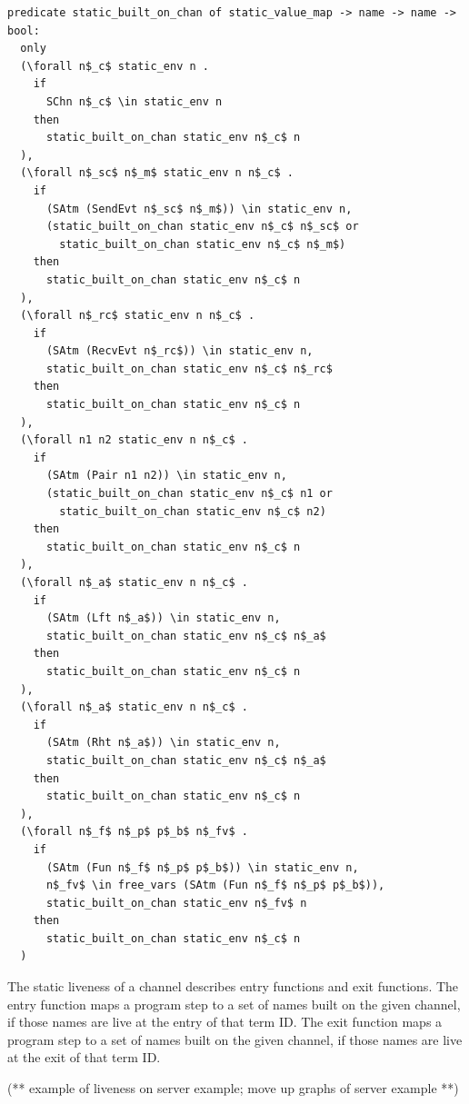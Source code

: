 \documentclass[10pt]{article}
\begin{document}
\begin{lstlisting}[language=logic, mathescape]
  predicate static_built_on_chan of static_value_map -> name -> name -> bool:
  only
  (\forall n$_c$ static_env n .
    if 
      SChn n$_c$ \in static_env n 
    then 
      static_built_on_chan static_env n$_c$ n
  ),
  (\forall n$_sc$ n$_m$ static_env n n$_c$ . 
    if
      (SAtm (SendEvt n$_sc$ n$_m$)) \in static_env n,
      (static_built_on_chan static_env n$_c$ n$_sc$ or
        static_built_on_chan static_env n$_c$ n$_m$)
    then 
      static_built_on_chan static_env n$_c$ n
  ),
  (\forall n$_rc$ static_env n n$_c$ . 
    if  
      (SAtm (RecvEvt n$_rc$)) \in static_env n,
      static_built_on_chan static_env n$_c$ n$_rc$
    then 
      static_built_on_chan static_env n$_c$ n
  ),
  (\forall n1 n2 static_env n n$_c$ . 
    if  
      (SAtm (Pair n1 n2)) \in static_env n,
      (static_built_on_chan static_env n$_c$ n1 or
        static_built_on_chan static_env n$_c$ n2)
    then 
      static_built_on_chan static_env n$_c$ n
  ),
  (\forall n$_a$ static_env n n$_c$ .
    if
      (SAtm (Lft n$_a$)) \in static_env n,
      static_built_on_chan static_env n$_c$ n$_a$
    then 
      static_built_on_chan static_env n$_c$ n
  ),
  (\forall n$_a$ static_env n n$_c$ .
    if
      (SAtm (Rht n$_a$)) \in static_env n,
      static_built_on_chan static_env n$_c$ n$_a$
    then 
      static_built_on_chan static_env n$_c$ n
  ),
  (\forall n$_f$ n$_p$ p$_b$ n$_fv$ .
    if
      (SAtm (Fun n$_f$ n$_p$ p$_b$)) \in static_env n,
      n$_fv$ \in free_vars (SAtm (Fun n$_f$ n$_p$ p$_b$)),
      static_built_on_chan static_env n$_fv$ n
    then
      static_built_on_chan static_env n$_c$ n
  )
\end{lstlisting}


The static liveness of a channel describes entry functions and exit functions.
The entry function maps a program step to a set of names built on
the given channel, if those names are live at the entry of that term ID.
The exit function maps a program step to a
set of names built on the given channel, if those names are live at the exit of that
term ID.


(**
example of liveness on server example;
move up graphs of server example 
**)
\end{document}
